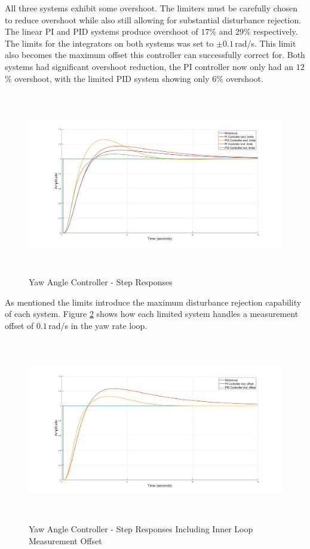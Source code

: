 	All three systems exhibit some overshoot. The limiters must be carefully chosen to reduce overshoot while also still allowing for substantial disturbance rejection. The linear PI and PID systems produce overshoot of $17$\% and $29$\% respectively. The limits for the integrators on both systems was set to $\pm 0.1$\,rad/s. This limit also becomes the maximum offset this controller can successfully correct for. Both systems had significant overshoot reduction, the PI controller now only had an $12$\% overshoot, with the limited PID system showing only $6$\% overshoot. 
			
	\begin{figure}[H]
		\centering
		\includegraphics[height = 8cm]{../Design/Matlab/Controllers/yaw_angle_step_both_limits.jpg}
		\caption{Yaw Angle Controller -  Step Responses}
		\label{IM_YawAngleStep}
	\end{figure}
	
	As mentioned the limits introduce the maximum disturbance rejection capability of each system. Figure \ref{IM_YawAngleStepBoth} shows how each limited system handles a measurement offset of $0.1$\,rad/s in the yaw rate loop.
	
	\begin{figure}[H]
		\centering
		\includegraphics[height = 8cm]{../Design/Matlab/Controllers/yaw_angle_step_both_dist.jpg}
		\caption{Yaw Angle Controller -  Step Responses Including Inner Loop Measurement Offset}
		\label{IM_YawAngleStepBoth}
	\end{figure}
	
